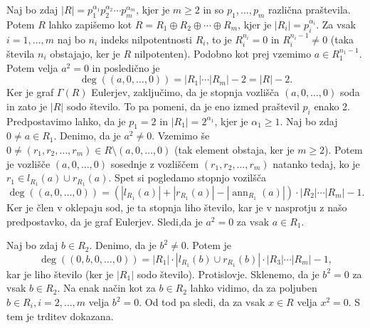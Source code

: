 \documentclass[a4paper, 12pt]{amsart}
\theoremstyle{definition} %
\theoremstyle{plain} %
\DeclareMathOperator{\ann}{ann}
\begin{document}
Naj bo zdaj $|R| = p_1^{\alpha_1} p_2^{\alpha_2} \cdots p_m^{\alpha_m}$, kjer je $m \ge 2$ in so $p_1,\dots,p_m$ različna praštevila. Potem $R$ lahko zapišemo kot $R= R_1 \oplus R_2 \oplus \cdots \oplus R_m$, kjer je $|R_i|  = p_i^{\alpha_i}$. Za vsak $i=1,\dots, m$ naj bo $n_i$ indeks nilpotentnosti $R_i$, to je $R_i^{n_i} =0 $ in $R_i^{n_i-1} \neq 0$ (taka števila $n_i$ obstajajo, ker je $R$ nilpotenten). Podobno kot prej vzemimo $a\in R_1^{n_1 - 1}$. Potem velja $a^2 = 0$ in posledično je 
$$
\deg((a,0,\dots,0)) = |R_1|\cdots|R_m| - 2 = |R| - 2.
$$ 
Ker je graf $\Gamma(R)$ Eulerjev, zaključimo, da je stopnja vozlišča $(a,0,\dots,0)$ soda in zato je $|R | $ sodo število. To pa pomeni, da je eno izmed praštevil $p_i$ enako 2. Predpostavimo lahko, da je $p_1 = 2$ in $|R_1| = 2^{\alpha_1}$, kjer je $\alpha_1 \ge 1$. Naj bo zdaj $0\neq a\in R_1$. Denimo, da je $a^2 \neq 0$. Vzemimo še $0\neq (r_1,r_2,\dots,r_m)\in R\setminus (a,0,\dots,0)$ (tak element obstaja, ker je $m\ge 2$). Potem je vozlišče $(a,0,\dots,0)$ sosednje z vozliščem $(r_1,r_2,\dots,r_m)$ natanko tedaj, ko je $r_1\in l_{R_1}(a)\cup r_{R_1}(a)$. Spet si pogledamo stopnjo vozilšča 
$$
\deg((a,0,\dots,0)) = (|l_{R_1}(a) | + |r_{R_1}(a)| - |\ann_{R_1}(a)|)\cdot |R_2|\cdots |R_m| - 1.
$$
Ker je člen v oklepaju sod, je ta stopnja liho število, kar je v nasprotju z našo predpostavko, da je graf Eulerjev. Sledi,da je $a^2 = 0$ za vsak $a\in R_1$.

Naj bo zdaj $b\in R_2$. Denimo, da je $b^2 \neq 0$. Potem je 
$$
\deg((0,b,0,\dots,0)) = |R_1|\cdot|l_{R_1}(b) \cup r_{R_1}(b)| \cdot |R_3|\cdots|R_m| - 1,
$$
kar je liho število (ker je $|R_1|$ sodo število). Protislovje. Sklenemo, da je $b^2 = 0$ za vsak $b\in R_2$. Na enak način kot za $b\in R_2$ lahko vidimo, da za poljuben $b\in R_i, i=2,\dots,m$ velja $b^2=0$. Od tod pa sledi, da za vsak $x\in R$ velja $x^2 = 0$. S tem je trditev dokazana.

\endproof
\end{document}
